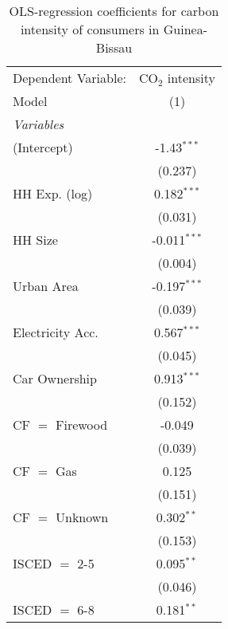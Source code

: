 
\begin{table}[htbp!]
   \centering
   \small
   \begin{adjustbox}{width = 1\textwidth, max height = 0.95\textheight, center}
      \begin{threeparttable}[b]
         \caption{\label{tab:OLS_1_GNB} OLS-regression coefficients for carbon intensity of consumers in Guinea-Bissau}
         \begin{tabular}{lc}
            \tabularnewline \midrule \midrule
            Dependent Variable: & CO$_{2}$ intensity\\  
            Model               & (1)\\  
            \midrule
            \emph{Variables}\\
            (Intercept)         & -1.43$^{***}$\\   
                                & (0.237)\\   
            HH Exp. (log)       & 0.182$^{***}$\\   
                                & (0.031)\\   
            HH Size             & -0.011$^{***}$\\   
                                & (0.004)\\   
            Urban Area          & -0.197$^{***}$\\   
                                & (0.039)\\   
            Electricity Acc.    & 0.567$^{***}$\\   
                                & (0.045)\\   
            Car Ownership       & 0.913$^{***}$\\   
                                & (0.152)\\   
            CF $=$ Firewood     & -0.049\\   
                                & (0.039)\\   
            CF $=$ Gas          & 0.125\\   
                                & (0.151)\\   
            CF $=$ Unknown      & 0.302$^{**}$\\   
                                & (0.153)\\   
            ISCED $=$ 2-5       & 0.095$^{**}$\\   
                                & (0.046)\\   
            ISCED $=$ 6-8       & 0.181$^{**}$\\   

\end{tabular}
\end{threeparttable}
\end{adjustbox}
\end{table}
